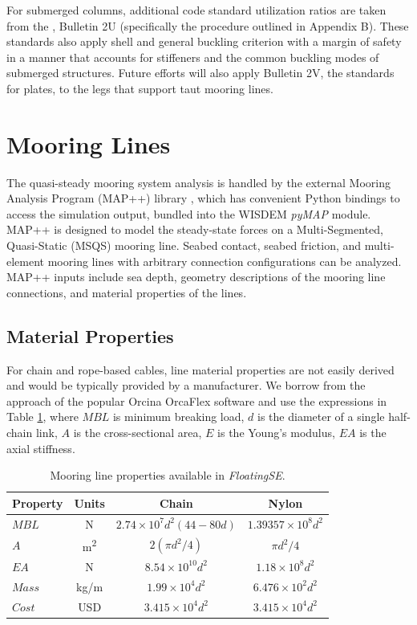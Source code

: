 For submerged columns, additional code standard utilization ratios are
taken from the \citet{api2U}, Bulletin 2U (specifically the procedure
outlined in Appendix B).  These standards also apply shell and general
buckling criterion with a margin of safety in a manner that accounts for
stiffeners and the common buckling modes of submerged structures.
Future efforts will also apply Bulletin 2V, the standards for plates, to
the legs that support taut mooring lines.


\section{Mooring Lines}
The quasi-steady mooring system analysis is handled by the external
Mooring Analysis Program (MAP++) library \citep{MAP}, which has
convenient Python bindings to access the simulation output, bundled into
the WISDEM \textit{pyMAP} module. MAP++ is designed to model the
steady-state forces on a Multi-Segmented, Quasi-Static (MSQS) mooring
line. Seabed contact, seabed friction, and multi-element mooring lines
with arbitrary connection configurations can be analyzed.  MAP++ inputs
include sea depth, geometry descriptions of the mooring line
connections, and material properties of the lines.

\subsection{Material Properties}
For chain and rope-based cables, line material properties are not easily
derived and would be typically provided by a manufacturer.  We borrow
from the approach of the popular Orcina OrcaFlex software \citep{orca}
and use the expressions in Table \ref{tbl:mooring_props}, where $MBL$ is
minimum breaking load, $d$ is the diameter of a single half-chain link,
$A$ is the cross-sectional area, $E$ is the Young's modulus, $EA$
is the axial stiffness.

\begin{table}[htbp]
  \begin{center}
    {\small
      \caption{Mooring line properties available in \textit{FloatingSE}.}
      \label{tbl:mooring_props}
      \begin{tabular}{lccc} \hline
        \textbf{Property} & \textbf{Units} & \textbf{Chain} & \textbf{Nylon} \\ \hline \hline
        $MBL$ & \unit{N} & $2.74\times 10^7  d^2 \left(44 - 80d\right)$ & $1.39357\times 10^8  d^2$\\
        $A$ & \unit{m^2} & $2\left(\pi d^2 / 4 \right)$ & $\pi d^2 / 4$\\
        $EA$ & \unit{N} & $8.54\times 10^{10} d^2$ & $1.18\times 10^8 d^2$ \\
        $Mass$ & \unit{kg/m} & $1.99\times 10^4 d^2$ & $6.476\times 10^2 d^2$\\
        $Cost$ & \unit{USD} & $3.415\times 10^4 d^2$ & $3.415\times 10^4 d^2$\\
        \hline
      \end{tabular}
    }
  \end{center}
\end{table}

